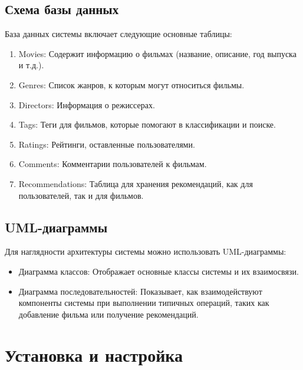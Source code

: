 \hypertarget{ux441ux445ux435ux43cux430-ux431ux430ux437ux44b-ux434ux430ux43dux43dux44bux445}{%
\subsection*{Схема базы
данных}\label{ux441ux445ux435ux43cux430-ux431ux430ux437ux44b-ux434ux430ux43dux43dux44bux445}}

База данных системы включает следующие основные таблицы: 
\begin{enumerate}
    \item 
Movies: Содержит информацию о фильмах (название, описание, год
выпуска и т.д.). 
\item 
Genres: Список жанров, к которым могут
относиться фильмы. 
\item 
Directors: Информация о режиссерах. 
\item 
Tags: Теги для фильмов, которые помогают в классификации и
поиске. 
\item 
Ratings: Рейтинги, оставленные пользователями. 
\item 
Comments: Комментарии пользователей к фильмам. 
\item 
Recommendations: Таблица для хранения рекомендаций, как для
пользователей, так и для фильмов.
\end{enumerate}
\hypertarget{uml-ux434ux438ux430ux433ux440ux430ux43cux43cux44b}{%
\subsection*{UML-диаграммы}\label{uml-ux434ux438ux430ux433ux440ux430ux43cux43cux44b}}

Для наглядности архитектуры системы можно использовать UML-диаграммы: 
\begin{itemize}
    \item 
Диаграмма классов: Отображает основные классы системы и их
взаимосвязи. 
    \item 
Диаграмма последовательностей: Показывает, как
взаимодействуют компоненты системы при выполнении типичных операций,
таких как добавление фильма или получение рекомендаций.
\end{itemize}
\hypertarget{ux443ux441ux442ux430ux43dux43eux432ux43aux430-ux438-ux43dux430ux441ux442ux440ux43eux439ux43aux430}{%
\section{Установка и
настройка}\label{ux443ux441ux442ux430ux43dux43eux432ux43aux430-ux438-ux43dux430ux441ux442ux440ux43eux439ux43aux430}}

